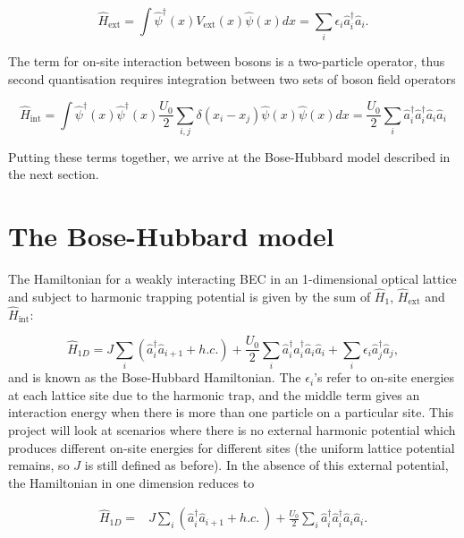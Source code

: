 \documentclass[a4paper,10pt]{article}
\begin{document}
\begin{equation}
 \hat{H}_{\text{ext}}=\int  \hat{\psi}^{\dagger}(x) V_{\text{ext}}(x)  \hat{\psi}(x)dx = \sum_i \epsilon_i \hat{a}_i^{\dagger}\hat{a}_i.
\end{equation}

The term for on-site interaction between bosons is a two-particle operator, thus second quantisation requires integration between two sets of boson field operators 

\begin{equation}
\hat{H}_{\text{int}}= \int  \hat{\psi}^{\dagger}(x)\hat{\psi}^{\dagger}(x) \frac{U_0}{2}\sum_{i,j}\delta(x_{i}-x_{j})  \hat{\psi}(x) \hat{\psi}(x) dx = \frac{U_0}{2}\sum_i \hat{a}_i^{\dagger}\hat{a}_i^{\dagger}\hat{a}_i\hat{a}_i
\end{equation}


Putting these terms together, we arrive at the Bose-Hubbard model described in the next section.
\newpage



\newpage
\section{The Bose-Hubbard model}

The Hamiltonian for a weakly interacting BEC in an 1-dimensional optical lattice and subject to harmonic trapping potential is given by the sum of $\hat{H}_1$, $\hat{H}_{\text{ext}}$ and $\hat{H}_{\text{int}}$:

\begin{equation}
 \hat{H}_{1D}=J\sum_{i}(\hat{a}^\dagger_{i}\hat{a}_{i+1}+h.c.)+\frac{U_0}{2}\sum_{i}\hat{a}^\dagger_{i}\hat{a}^\dagger_{i}\hat{a}_{i}\hat{a}_{i}+\sum_{i}{\epsilon_i}\hat{a}^\dagger_{j}\hat{a}_{j},
\end{equation}
and is known as the Bose-Hubbard Hamiltonian. The $\epsilon_i$'s refer to on-site energies at each lattice site due to the harmonic trap, 
and the middle term gives an interaction energy when there is more than one particle on a particular site.
This project will look at scenarios where there is no external harmonic potential which produces different on-site energies for different sites (the uniform lattice potential remains, so $J$ is 
still defined as before).  
In the absence of this external potential, the Hamiltonian in one dimension reduces to

\begin{equation}
\begin{align*}
\hat{H}_{1D}=&J\sum_{i}(\hat{a}^\dagger_{i}\hat{a}_{i+1}+h.c.\ ) +\frac{U_0}{2}\sum_{i}\hat{a}^\dagger_{i}\hat{a}^\dagger_{i}\hat{a}_{i}\hat{a}_{i}.
\end{align*}
\end{equation}
\end{document}
